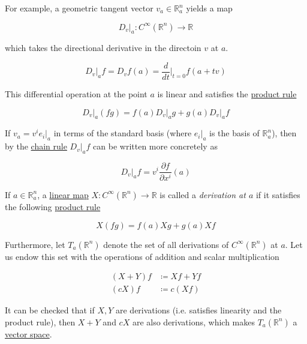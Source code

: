 \documentclass{article}
\newcounter{definition}[section]
\newcounter{example}[section]
\begin{document}
    For example, a geometric tangent vector $v_a \in \mathbb{R}^n_a$ yields a map

      \begin{equation}
        D_v \big|_a: C^\infty (\mathbb{R}^n) \to \mathbb{R}
      \end{equation}

    which takes the directional derivative in the directoin $v$ at $a$.

      \begin{equation}
        D_v \big|_a f = D_v f(a) = \frac{d}{dt} \bigg|_{t=0} f(a + t v)
      \end{equation}

    This differential operation at the point $a$ is linear and satisfies the \hyperref[mv-thm:product-rule-2]{product rule}

      \begin{equation}
        D_v \big|_a (f g) = f(a) D_v \big|_a g +g(a) D_v \big|_a f
      \end{equation}

    If $v_a = v^i e_i |_a$ in terms of the standard basis (where $e_i |_a$ is the basis of $\mathbb{R}^n_a$), then by the \hyperref[mv-thm:chain-rule]{chain rule} $D_v |_a f$ can be written more concretely as

      \begin{equation}
        D_v \big|_a f = v^i \frac{\partial f}{\partial x^i} (a)
      \end{equation}

    \begin{definition}[Derivation at $a$]
      \label{def:derivation-at-a}
      If $a \in \mathbb{R}^n_a$, a \hyperref[lin-def:linear_map]{linear map} $X: C^\infty (\mathbb{R}^n) \to \mathbb{R}$ is called a \textit{derivation at $a$} if it satisfies the following \hyperref[mv-thm:product-rule-2]{product rule} 

        \begin{equation}
          X (f g) = f(a) X g + g(a) X f
        \end{equation}

      Furthermore, let $T_a (\mathbb{R}^n)$ denote the set of all derivations of $C^\infty (\mathbb{R}^n)$ at $a$. Let us endow this set with the operations of addition and scalar multiplication 

      \begin{align*}
        (X + Y) f & \coloneqq X f + Y f \\
        (c X) f & \coloneqq c (X f)
      \end{align*}

      It can be checked that if $X, Y$ are derivations (i.e. satisfies linearity and the product rule), then $X + Y$ and $c X$ are also derivations, which makes $T_a (\mathbb{R}^n)$ a \hyperref[lin-def:vector-space]{vector space}. 
    \end{definition}
\end{document}
